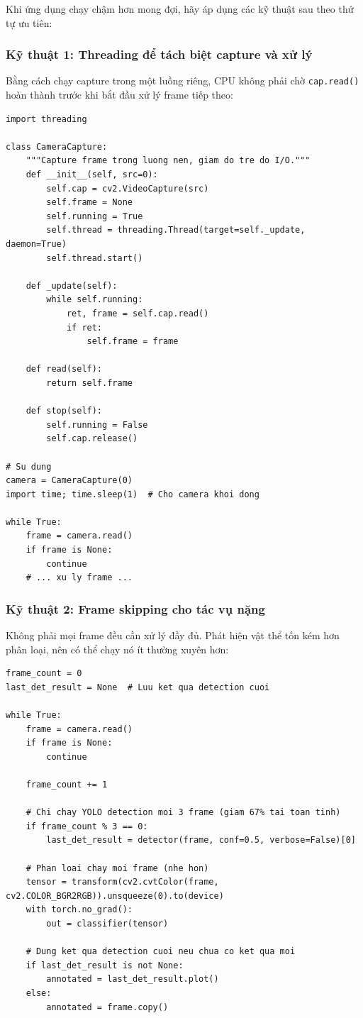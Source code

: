 Khi ứng dụng chạy chậm hơn mong đợi, hãy áp dụng các kỹ thuật sau theo thứ tự ưu tiên:

\subsubsection{Kỹ thuật 1: Threading để tách biệt capture và xử lý}
\label{subsubsec:rt_threading}

Bằng cách chạy capture trong một luồng riêng, CPU không phải chờ \texttt{cap.read()} hoàn thành trước khi bắt đầu xử lý frame tiếp theo:

\begin{verbatim}
import threading

class CameraCapture:
    """Capture frame trong luong nen, giam do tre do I/O."""
    def __init__(self, src=0):
        self.cap = cv2.VideoCapture(src)
        self.frame = None
        self.running = True
        self.thread = threading.Thread(target=self._update, daemon=True)
        self.thread.start()

    def _update(self):
        while self.running:
            ret, frame = self.cap.read()
            if ret:
                self.frame = frame

    def read(self):
        return self.frame

    def stop(self):
        self.running = False
        self.cap.release()

# Su dung
camera = CameraCapture(0)
import time; time.sleep(1)  # Cho camera khoi dong

while True:
    frame = camera.read()
    if frame is None:
        continue
    # ... xu ly frame ...
\end{verbatim}

\subsubsection{Kỹ thuật 2: Frame skipping cho tác vụ nặng}
\label{subsubsec:rt_frame_skip}

Không phải mọi frame đều cần xử lý đầy đủ. Phát hiện vật thể tốn kém hơn phân loại, nên có thể chạy nó ít thường xuyên hơn:

\begin{verbatim}
frame_count = 0
last_det_result = None  # Luu ket qua detection cuoi

while True:
    frame = camera.read()
    if frame is None:
        continue

    frame_count += 1

    # Chi chay YOLO detection moi 3 frame (giam 67% tai toan tinh)
    if frame_count % 3 == 0:
        last_det_result = detector(frame, conf=0.5, verbose=False)[0]

    # Phan loai chay moi frame (nhe hon)
    tensor = transform(cv2.cvtColor(frame, cv2.COLOR_BGR2RGB)).unsqueeze(0).to(device)
    with torch.no_grad():
        out = classifier(tensor)

    # Dung ket qua detection cuoi neu chua co ket qua moi
    if last_det_result is not None:
        annotated = last_det_result.plot()
    else:
        annotated = frame.copy()
\end{verbatim}

